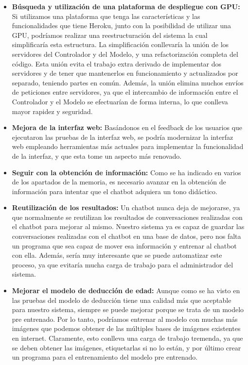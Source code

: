 \begin{itemize}
\item \textbf{Búsqueda y utilización de una plataforma de despliegue con GPU:} Si utilizamos una plataforma que tenga las características y las funcionalidades que tiene Heroku, junto con la posibilidad de utilizar una GPU, podríamos realizar una reestructuración del sistema la cual simplificaría esta estructura. La simplificación conllevaría la unión de los servidores del Controlador y del Modelo, y una refactorización completa del código. Esta unión evita el trabajo extra derivado de implementar dos servidores y de tener que mantenerlos en funcionamiento y actualizados por separado, teniendo partes en común. Además, la unión elimina muchos envíos de peticiones entre servidores, ya que el intercambio de información entre el Controlador y el Modelo se efectuarían de forma interna, lo que conlleva mayor rapidez y seguridad.
\item \textbf{Mejora de la interfaz web:} Basándonos en el feedback de los usuarios que ejecutaron las pruebas de la interfaz web, se podría modernizar la interfaz web empleando herramientas más actuales para implementar la funcionalidad de la interfaz, y que esta tome un aspecto más renovado.
\item \textbf{Seguir con la obtención de información:} Como se ha indicado en varios de los apartados de la memoria, es necesario avanzar en la obtención de información para intentar que el chatbot adquiera un tono didáctico.
\item \textbf{Reutilización de los resultados:} Un chatbot nunca deja de mejorarse, ya que normalmente se reutilizan los resultados de conversaciones realizadas con el chatbot para mejorar al mismo. Nuestro sistema ya es capaz de guardar las conversaciones realizadas con el chatbot en una base de datos, pero nos falta un programa que sea capaz de mover esa información y entrenar al chatbot con ella. Además, sería muy interesante que se puede automatizar este proceso, ya que evitaría mucha carga de trabajo para el administrador del sistema.
\item \textbf{Mejorar el modelo de deducción de edad:} Aunque como se ha visto en las pruebas del modelo de deducción tiene una calidad más que aceptable para nuestro sistema, siempre se puede mejorar porque se trata de un modelo pre entrenado. Por lo tanto, podríamos entrenar al modelo con muchas más imágenes que podemos obtener de las múltiples bases de imágenes existentes en internet. Claramente, esto conlleva una carga de trabajo tremenda, ya que se deben obtener las imágenes, etiquetarlas si no lo están, y por último crear un programa para el entrenamiento del modelo pre entrenado.

\end{itemize}
